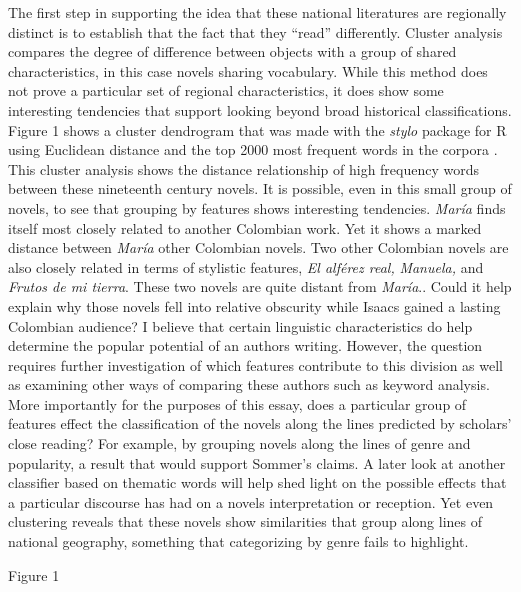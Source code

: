 \documentclass[12pt]{report}\usepackage[]{graphicx}\usepackage[]{color}
\begin{document}
\begin{spacing}{1.9}
The first step in supporting the idea that these national literatures are regionally distinct is to establish that the fact that they \enquote{read} differently.
Cluster analysis compares the degree of difference between objects with a group of shared characteristics, in this case novels sharing vocabulary.
While this method does not prove a particular set of regional characteristics, it does show some interesting tendencies that support looking beyond broad historical classifications. 
Figure 1 shows a cluster dendrogram that was made with the \textit{stylo} package for R using Euclidean distance and the top 2000 most frequent words in the corpora \autocite{Eder2013, RCT2014}.
This cluster analysis shows the distance relationship of high frequency words between these nineteenth century novels.
It is possible, even in this small group of novels, to see that grouping by features shows interesting tendencies. 
\textit{María} finds itself most closely related to another Colombian work.
Yet it shows a marked distance between \textit{María} other Colombian novels.
Two other Colombian novels are also closely related in terms of stylistic features, \textit{El alférez real,} \textit{Manuela,} and \textit{Frutos de mi tierra}.
These two novels are quite distant from \textit{María}..
Could it help explain why those novels fell into relative obscurity while Isaacs gained a lasting Colombian audience?
I believe that certain linguistic characteristics do help determine the popular potential of an authors writing.
However, the question requires further investigation of which features contribute to this division as well as examining other ways of comparing these authors such as keyword analysis.
More importantly for the purposes of this essay, does a particular group of features effect the classification of the novels along the lines predicted by scholars' close reading?
For example, by grouping novels along the lines of genre and popularity, a result that would support Sommer's claims.
A later look at another classifier based on thematic words will help shed light on the possible effects that a particular discourse has had on a novels interpretation or reception.
Yet even clustering reveals that these novels show similarities that group along lines of national geography, something that categorizing by genre fails to highlight.


Figure 1



\end{spacing}
\end{document}
